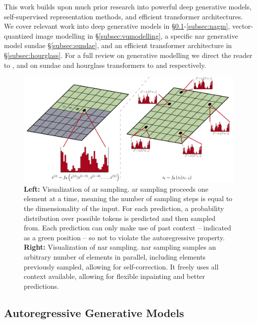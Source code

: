 This work builds upon much prior research into powerful deep generative models,
self-supervised representation methods, and efficient transformer architectures.
We cover relevant work into deep generative models in
\S\ref{subsec:agm}-\ref{subsec:nagm}, vector-quantized image modelling in
\S\ref{subsec:vqmodelling}, a specific \acrshort{nar} generative model
\gls{sundae} \S\ref{subsec:sundae}, and an efficient transformer architecture in
\S\ref{subsec:hourglass}. For a full review on generative modelling we direct
the reader to \citet{bondtaylor2021review}, and on \gls{sundae} and hourglass
transformers to \citet{savinov2022stepunrolled} and
\citet{nawrot2021hierarchical} respectively.

\begin{figure}[ht!]
    \centering
    \includegraphics[width=\textwidth]{figures/AR-NAR.pdf}
    \caption{
        \textbf{Left:} Visualization of \acrfull{ar} sampling. \gls{ar} sampling
        proceeds one element at a time, meaning the number of sampling steps
        is equal to the dimensionality of the input. For each prediction, a
        probability distribution over possible tokens is predicted and then
        sampled from. Each prediction can only make use of past context --
        indicated as a green position -- so not to violate the autoregressive
        property.
        \textbf{Right:} Visualization of \acrfull{nar} sampling. \gls{nar}
        sampling samples an arbitrary number of elements in parallel, including
        elements previously sampled, allowing for self-correction. It freely
        uses all context available, allowing for flexible inpainting and
        better predictions.
    }
\end{figure}

\subsection{Autoregressive Generative Models}
\label{subsec:agm}

